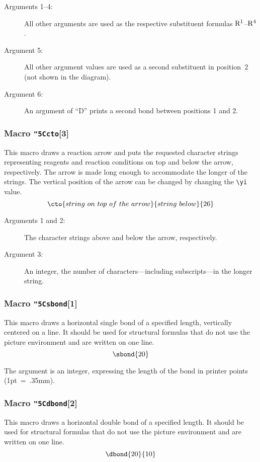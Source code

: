  \begin{description}
 \item[{\rm Arguments 1--4:}] \rhq  All other
      arguments are used as the respective substituent
      formulas ${\rm R^1}$--${\rm R^4}$.
 \item[{\rm Argument 5:}] \rhq  All other argument
      values are used as a second substituent in position~2
      (not shown in the diagram).
 \item[{\rm Argument 6:}] An argument of ``D''
      prints a second bond between positions 1 and 2. \rii
 \end{description}
 
\subsubsection{Macro {\tt\char"5C{}cto}[3]}
  This macro draws a reaction arrow and puts the requested
 character strings representing reagents and reaction
 conditions on top and below the arrow, respectively.
 The arrow is made long enough to accommodate the longer
 of the strings. The vertical position of the arrow can be
 changed by changing the \verb+\yi+ value.
 \[ \cto{string\  on\  top\  of\  the\  arrow}{string\  below}{26} \]
 
 \begin{description}
 \item[{\rm Arguments 1 and 2:}] The character
      strings above and below the arrow, respectively.
 \item[{\rm Argument 3:}] An integer, the number of
 characters---including subscripts---in the longer string.
 \end{description}
 
\subsubsection{Macro {\tt\char"5C{}sbond}[1]}
  This macro draws a horizontal single bond of a specified
 length, vertically centered on a line. It should be used
 for structural formulas that do not use the picture
 environment and are written on one line.
 \[ \sbond{20}  \]
 
 The argument is an integer, expressing the length of the
 bond in printer points (1pt~=~.35mm).
 
\subsubsection{Macro {\tt\char"5C{}dbond}[2]}
   This macro draws a horizontal double bond of a
 specified length. It should be used for structural
 formulas that do not use the picture environment and
 are written on one line.
 \[ \dbond{20}{10}  \]
 

